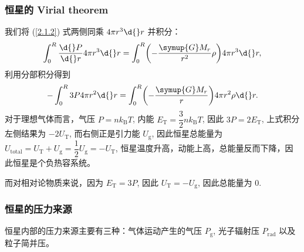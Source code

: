 \documentclass[../天体物理基础.tex]{subfiles}
\begin{document}
\subsubsection{恒星的 Virial theorem}
我们将 (\ref{2.1.2}) 式两侧同乘 $4\pi r^{3}\d{}r$ 并积分：
\begin{equation}
\int_{0}^{R}\frac{\d{}P}{\d{}r}4\pi{}r^{3}\d{}r=\int_{0}^{R}\mleft(-\frac{\symup{G}M_{r}}{r^{2}}\rho\mright) 4\pi{}r^{3}\d{}r,
\end{equation}
利用分部积分得到
\begin{equation}
-\int_{0}^{R}3P4\pi{}r^{2}\d{}r=\int_{0}^{R}\mleft(-\frac{\symup{G}M_{r}}{r}\mright) 4\pi{}r^{2}\rho\d{}r.
\end{equation}
对于理想气体而言，气压 $P=n{}k_{\mathrm{B}}T$, 内能 $E_{\mathrm{T}}=\dfrac{3}{2}nk_{\mathrm{B}}T$, 因此 $3P=2E_{\mathrm{T}}$, 上式积分左侧结果为 $-2U_{\mathrm{T}}$, 而右侧正是引力能 $U_{\mathrm{g}}$, 因此恒星总能量为 $U_{\mathrm{total}}=U_{\mathrm{T}}+U_{\mathrm{g}}=\dfrac{1}{2}U_{\mathrm{g}}=-U_{\mathrm{T}}$, 恒星温度升高，动能上高，总能量反而下降，因此恒星是个负热容系统。

而对相对论物质来说，因为 $E_{\mathrm{T}}=3P$, 因此 $U_{\mathrm{T}}=-U_{\mathrm{g}}$, 因此总能量为 $0$.

\subsubsection{恒星的压力来源}
恒星内部的压力来源主要有三种：气体运动产生的气压 $P_{\mathrm{g}}$, 光子辐射压 $P_{\mathrm{rad}}$ 以及粒子简并压。
\end{document}
